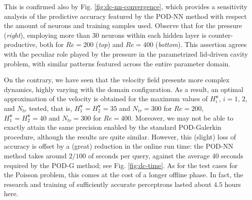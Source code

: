 \documentclass{elsarticle}
\numberwithin{equation}{section}
\theoremstyle{theorem}
\theoremstyle{definition}
\theoremstyle{remark}
\theoremstyle{proposition}
\numberwithin{figure}{section}
\newcommand{\bg}[1]{\boldsymbol{#1}}
\begin{document}
		This is confirmed also by Fig. \ref{fig:dc-nn-convergence}, which provides a sensitivity analysis of the predictive accuracy featured by the POD-NN method with respect the amount of neurons and training samples used. Observe that for the pressure (\emph{right}), employing more than $30$ neurons within each hidden layer is counter-productive, both for $Re = 200$ (\emph{top}) and $Re = 400$ (\emph{bottom}). This assertion agrees with the peculiar role played by the pressure in the parametrized lid-driven cavity problem, with similar patterns featured across the entire parameter domain. 
		
		On the contrary, we have seen that the velocity field presents more complex dynamics, highly varying with the domain configuration. As a result, an optimal approximation of the velocity is obtained for the maximum values of $H_i^{\bg{v}}$, $i = 1, \, 2$, and $N_{tr}$ tested, that is, $H_1^{\bg{v}} = H_2^{\bg{v}} = 35$ and $N_{tr} = 300$ for $Re = 200$, $H_1^{\bg{v}} = H_2^{\bg{v}} = 40$ and $N_{tr} = 300$ for $Re = 400$. Moreover, we may not be able to exactly attain the same precision enabled by the standard POD-Galerkin procedure, although the results are quite similar. However, this (slight) loss of accuracy is offset by a (great) reduction in the online run time: the POD-NN method takes around $2/100$ of seconds per query, against the average $40$ seconds required by the POD-G method; see Fig. \ref{fig:dc-time}. As for the test cases for the Poisson problem, this comes at the cost of a longer offline phase. In fact, the research and training of sufficiently accurate perceptrons lasted about $4.5$ hours here.
										
\end{document}
